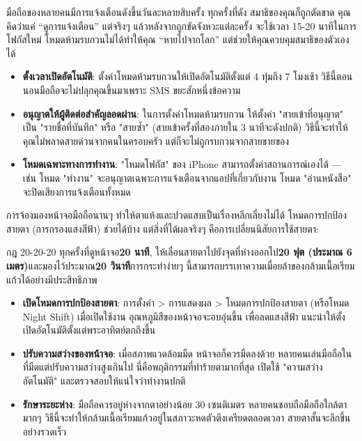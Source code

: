 
มือถือของหลายคนมีการแจ้งเตือนดังขึ้นวันละหลายสิบครั้ง ทุกครั้งที่ดัง สมาธิของคุณก็ถูกตัดขาด คุณคิดว่าแค่ “ดูการแจ้งเตือน” แต่จริงๆ แล้วหลังจากถูกขัดจังหวะแต่ละครั้ง จะใช้เวลา 15-20 นาทีในการโฟกัสใหม่ โหมดห้ามรบกวนไม่ได้ทำให้คุณ “หายไปจากโลก” แต่ช่วยให้คุณควบคุมสมาธิของตัวเองได้

\begin{itemize}
  \item \textbf{ตั้งเวลาเปิดอัตโนมัติ}: ตั้งค่าโหมดห้ามรบกวนให้เปิดอัตโนมัติตั้งแต่ 4 ทุ่มถึง 7 โมงเช้า วิธีนี้ตอนนอนมือถือจะไม่ปลุกคุณขึ้นมาเพราะ SMS ขยะสักหนึ่งข้อความ
  \item \textbf{อนุญาตให้ผู้ติดต่อสำคัญลอดผ่าน}: ในการตั้งค่าโหมดห้ามรบกวน ให้ตั้งค่า "สายเข้าที่อนุญาต" เป็น "รายชื่อที่บันทึก" หรือ "สายซ้ำ" (สายเข้าครั้งที่สองภายใน 3 นาทีจะดังปกติ) วิธีนี้จะทำให้คุณไม่พลาดสายด่วนจากคนในครอบครัว แต่ก็จะไม่ถูกรบกวนจากสายขายของ
  \item \textbf{โหมดเฉพาะทางการทำงาน}: "โหมดโฟกัส" ของ iPhone สามารถตั้งค่าสถานการณ์เองได้ — เช่น โหมด "ทำงาน" จะอนุญาตเฉพาะการแจ้งเตือนจากแอปที่เกี่ยวกับงาน โหมด "อ่านหนังสือ" จะปิดเสียงการแจ้งเตือนทั้งหมด
\end{itemize}


การจ้องมองหน้าจอมือถือนานๆ ทำให้ตาแห้งและปวดแสบเป็นเรื่องหลีกเลี่ยงไม่ได้ โหมดการปกป้องสายตา (การกรองแสงสีฟ้า) ช่วยได้บ้าง แต่สิ่งที่ได้ผลจริงๆ คือการเปลี่ยนนิสัยการใช้สายตา:

\begin{tcbinfo}{กฎ 20-20-20}
ทุกครั้งที่ดูหน้าจอ\textbf{20 นาที}, ให้เลื่อนสายตาไปยังจุดที่ห่างออกไป\textbf{20 ฟุต (ประมาณ 6 เมตร)}และมองไว้ประมาณ\textbf{20 วินาที}การกระทำง่ายๆ นี้สามารถบรรเทาความเมื่อยล้าของกล้ามเนื้อเรียมแก้วได้อย่างมีประสิทธิภาพ

\end{tcbinfo}

\begin{itemize}
  \item \textbf{เปิดโหมดการปกป้องสายตา}: การตั้งค่า > การแสดงผล > โหมดการปกป้องสายตา (หรือโหมด Night Shift) เมื่อเปิดใช้งาน อุณหภูมิสีของหน้าจอจะอบอุ่นขึ้น เพื่อลดแสงสีฟ้า แนะนำให้ตั้งเปิดอัตโนมัติตั้งแต่พระอาทิตย์ตกถึงขึ้น
  \item \textbf{ปรับความสว่างของหน้าจอ}: เมื่อสภาพแวดล้อมมืด หน้าจอก็ควรมืดลงด้วย หลายคนเล่นมือถือในที่มืดแต่ปรับความสว่างสูงเกินไป นี่คือพฤติกรรมที่ทำร้ายตามากที่สุด เปิดใช้ "ความสว่างอัตโนมัติ" และตรวจสอบให้แน่ใจว่าทำงานปกติ
  \item \textbf{รักษาระยะห่าง}: มือถือควรอยู่ห่างจากตาอย่างน้อย 30 เซนติเมตร หลายคนชอบถือมือถือใกล้ตามากๆ วิธีนี้จะทำให้กล้ามเนื้อเรียมแก้วอยู่ในสภาวะหดตัวตึงเครียดตลอดเวลา สายตาสั้นจะลึกขึ้นอย่างรวดเร็ว
\end{itemize}


